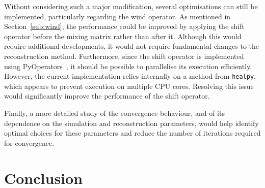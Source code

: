\documentclass[../../thesis.tex]{subfiles}
\begin{document}
Without considering such a major modification, several optimisations can still be implemented, particularly regarding the wind operator. As mentioned in Section~\ref{sub:wind}, the performance could be improved by applying the shift operator before the mixing matrix rather than after it. Although this would require additional developments, it would not require fundamental changes to the reconstruction method.
Furthermore, since the shift operator is implemented using PyOperators~\cite{PyOperators}, it should be possible to parallelise its execution efficiently. However, the current implementation relies internally on a method from \texttt{healpy}, which appears to prevent execution on multiple CPU cores. Resolving this issue would significantly improve the performance of the shift operator.

Finally, a more detailed study of the convergence behaviour, and of its dependence on the simulation and reconstruction parameters, would help identify optimal choices for these parameters and reduce the number of iterations required for convergence.

\section*{Conclusion}

\end{document}
